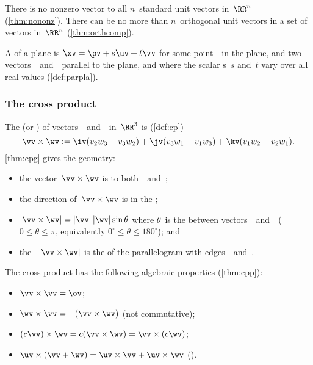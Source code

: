 \begin{itemize}
\itemlo There is no nonzero vector  to all \(n\)~{standard unit vector}s in~\(\RR^n\) (\cref{thm:nononz}).
There can be no more than \(n\)~orthogonal unit vectors in a set of vectors in~\(\RR^n\) (\cref{thm:orthcomp}).

\itemlo A  of a plane is \(\xv=\pv+s\uv+t\vv\) for some point~\pv\ in the plane, and two vectors~\uv\ and~\vv\  parallel to the plane, and where the scalar s~\(s\) and~\(t\) vary over all real values (\cref{def:parpla}).




\subsubsection{The cross product}

\itemhi The   (or ) of vectors~\vv\ and~\wv\ in~\(\RR^3\) is (\cref{def:cp})
\begin{equation*}
\vv\times\wv:=\iv(v_2w_3-v_3w_2)
+\jv(v_3w_1-v_1w_3)
+\kv(v_1w_2-v_2w_1).
\end{equation*}
\cref{thm:cpg} gives the geometry:
\begin{itemize}
\item the vector~\(\vv\times\wv\) is  to both~\vv\ and~\wv;

\item the direction of~\(\vv\times\wv\) is in the ; 

\item \(|\vv\times\wv|=|\vv|\,|\wv|\sin\theta\) where \(\theta\)~is the  between vectors~\vv\ and~\wv\ (\(0\leq\theta\leq\pi\), equivalently \(0^\circ\leq\theta\leq180^\circ\)); and

\item the ~\(|\vv\times\wv|\) is the  of the parallelogram with edges~\vv\ and~\wv.
\end{itemize}

\itemlo The cross product has the following algebraic properties (\cref{thm:cpp}):
\begin{itemize}
\item \(\vv\times\vv=\ov\);
\item \(\wv\times\vv=-(\vv\times\wv)\) \quad(not commutative);
\item \((c\vv)\times\wv=c(\vv\times\wv)=\vv\times(c\wv)\);
\item \(\uv\times(\vv+\wv)=\uv\times\vv+\uv\times\wv\) \quad().
\end{itemize}


\end{itemize}
